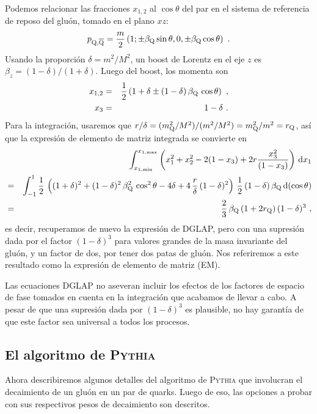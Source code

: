 Podemos relacionar las fracciones $x_{1,2}$ al $\cos\theta$ del par en el sistema de referencia de reposo del gluón, tomado en el plano $xz$:
\begin{equation}
p_{{\mathrm Q},\overline{\mathrm Q}} = \frac{m}{2} \left( 1; \pm \beta_{{\mathrm Q}} \sin\theta, 0, 
 \pm \beta_{{\mathrm Q}} \cos\theta \right) ~.
\label{kinp}
\end{equation}
Usando la proporción $\delta=m^2/M^2$, un boost de Lorentz en el eje $z$ es $\beta_z=(1-\delta)/(1+\delta)$. Luego del boost, los momenta son
\begin{eqnarray}
x_{1,2} & = & \frac{1}{2} \left(1 + \delta \pm (1 - \delta)
\, \beta_{{\mathrm Q}} \, \cos\theta \right) ~, \label{kinx} \\
x_3 & = & 1 - \delta ~.
\end{eqnarray}
Para la integración, usaremos que $r/\delta=(m_{\mathrm Q}^2/M^2)/(m^2/M^2)=m_{\mathrm Q}^2/m^2=r_{\mathrm Q}$, así que la expresión de elemento de matriz integrada se convierte en
\begin{eqnarray}
 &  & \int_{x_{1,\mathrm{min}}}^{x_{1,\mathrm{max}}} \left( x_1^2 + x_2^2 - 2(1 - x_3) 
+ 2r \frac{x_3^2}{(1 - x_3)} \right)  \, {\mathrm d} x_1 \nonumber \\
& = & \int_{-1}^1 \frac{1}{2} \, \left( (1 + \delta)^2 
+ (1 - \delta)^2 \, \beta_{{\mathrm Q}}^2 \, \cos^2\theta - 4 \delta 
+ 4 \, \frac{r}{\delta} \, (1 - \delta)^2 \right) \, \frac{1}{2} 
\, (1 - \delta) \, \beta_{{\mathrm Q}} \, {\mathrm d}(\cos\theta) \nonumber \\
& = & \frac{2}{3} \, \beta_{{\mathrm Q}} \, (1 + 2 r_{{\mathrm Q}}) \, (1 - \delta)^3 ~, 
\label{m2ME} 
\end{eqnarray}
es decir, recuperamos de nuevo la expresión de DGLAP, pero con una supresión dada por el factor $(1-\delta)^3$ para valores grandes de la masa invariante del gluón, y un factor de dos, por tener dos patas de gluón. Nos referiremos a este resultado como la expresión de elemento de matriz (EM).

Las ecuaciones DGLAP no aseveran incluir los efectos de los factores de espacio de fase tomados en cuenta en la integración que acabamos de llevar a cabo. A pesar de que una supresión dada por $(1-\delta)^3$ es plausible, no hay garantía de que este factor sea universal a todos los procesos.

\subsection{El algoritmo de \textsc{Pythia}}
\label{subsubsec:PythiaAlg}

Ahora describiremos algunos detalles del algoritmo de \textsc{Pythia} que involucran el decaimiento de un gluón en un par de quarks. Luego de eso, las opciones a probar con sus respectivos pesos de decaimiento son descritos.

